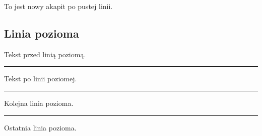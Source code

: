 \documentclass{article}
\begin{document}
To jest nowy akapit po pustej linii.




\subsection{Linia pozioma}



Tekst przed linią poziomą.




\noindent\rule{\linewidth}{0.4pt}



Tekst po linii poziomej.




\noindent\rule{\linewidth}{0.4pt}



Kolejna linia pozioma.




\noindent\rule{\linewidth}{0.4pt}



Ostatnia linia pozioma.
\end{document}
